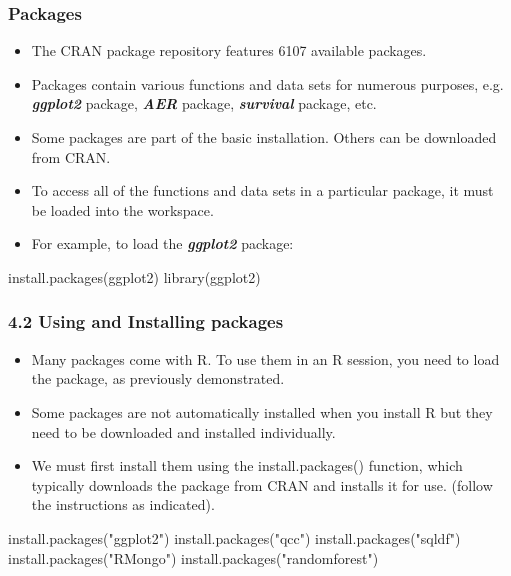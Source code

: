  
 \frametitle{Packages}
 \begin{itemize}
 \item The CRAN package repository features 6107 available packages. 
 \item Packages contain
 various functions and data sets for numerous purposes, e.g.
 \textbf{\textit{ggplot2}} package, \textbf{\textit{AER}} package, \textbf{\textit{survival}} package, etc.
 \item Some packages are part of the basic installation. Others can be
 downloaded from CRAN.
 \item To access all of the functions and data sets in a particular package,
 it must be loaded into the workspace. 
 \item For example, to load the
 \textbf{\textit{ggplot2}} package:
 \end{itemize}
 \begin{framed}
 \begin{semiverbatim}
 install.packages(ggplot2)
 library(ggplot2)
 \end{semiverbatim}
 \end{framed}
 
 
 \frametitle{4.2 Using and Installing packages}
 \begin{itemize}
 \item Many packages come with R. To use them in an R session, you need to load the package, as
 previously demonstrated.
 \item Some packages are not automatically installed when you install R but they need to be downloaded
 and installed individually. 
 \item We must first install them using the install.packages()
 function, which typically downloads the package from CRAN and installs it for use. (follow the
 instructions as indicated).
 \end{itemize}
 
 
 \begin{framed}
 \begin{semiverbatim}
 install.packages("ggplot2")
 install.packages("qcc")
 install.packages("sqldf")
 install.packages("RMongo")
 install.packages("randomforest")
 \end{semiverbatim}
 \end{framed}
 
